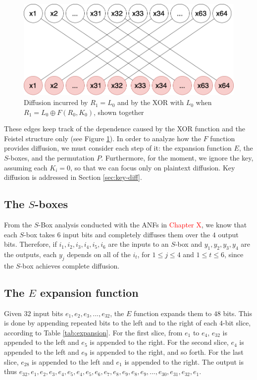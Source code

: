 \documentclass{report}
\begin{document}
\begin{figure}[h!]
    \centering
    \includegraphics[scale=0.3]{Grafo_DES-halves-trivial.png}
    \caption{Diffusion incurred by $R_1 = L_0$ and by the XOR with $L_0$ when $R_1 = L_0 \oplus F(R_0, K_0)$, shown together}
    \label{fig:feistel-xors-together}
\end{figure}

These edges keep track of the dependence caused by the XOR function and the Feistel structure only (see Figure \ref{fig:feistel-xors-together}). In order to analyze how the $F$ function provides diffusion, we must consider each step of it: the expansion function $E$, the $S$-boxes, and the permutation $P$. Furthermore, for the moment, we ignore the key, assuming each $K_i = 0$, so that we can focus only on plaintext diffusion. Key diffusion is addressed in Section \ref{sec:key-diff}.

\subsection{The $S$-boxes}
From the $S$-Box analysis conducted with the ANFs in \textcolor{red}{Chapter X}, we know that each $S$-box takes $6$ input bits and completely diffuses them over the $4$ output bits. Therefore, if $i_1, i_2, i_3, i_4, i_5, i_6$ are the inputs to an $S$-box and $y_1, y_2, y_3, y_4$ are the outputs, each $y_j$  depends on all of the $i_t$, for $1 \leq j \leq 4$ and $1 \leq t \leq 6$, since the $S$-box achieves complete diffusion.

\subsection{The $E$ expansion function}
Given $32$ input bits $e_1, e_2, e_3, ..., e_{32}$, the $E$ function expands them to $48$ bits. This is done by appending repeated bits to the left and to the right of each $4$-bit slice, according to Table \ref{tab:expansion}. For the first slice, from $e_1$ to $e_4$, $e_{32}$ is appended to the left and $e_5$ is appended to the right. For the second slice, $e_4$ is appended to the left and $e_9$ is appended to the right, and so forth. For the last slice, $e_{28}$ is appended to the left and $e_{1}$ is appended to the right. The output is thus $e_{32}, e_1, e_2, e_3, e_4, e_5, e_4, e_5, e_6, e_7, e_8, e_9, e_8, e_9, ..., e_{30}, e_{31}, e_{32}, e_1$. 
\end{document}
